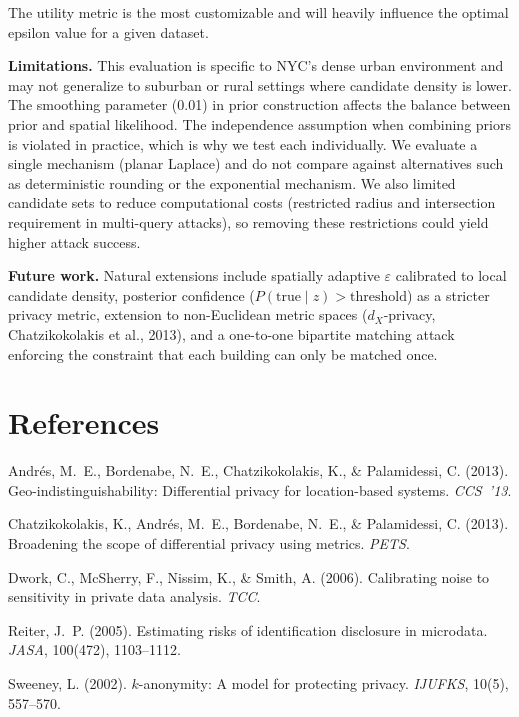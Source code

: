 \documentclass[11pt]{article}
\begin{document}
The utility metric is the most customizable and will heavily influence the optimal epsilon value for a given dataset.

\textbf{Limitations.} This evaluation is specific to NYC's dense urban environment and may not generalize to suburban or rural settings where candidate density is lower. The smoothing parameter (0.01) in prior construction affects the balance between prior and spatial likelihood. The independence assumption when combining priors is violated in practice, which is why we test each individually. We evaluate a single mechanism (planar Laplace) and do not compare against alternatives such as deterministic rounding or the exponential mechanism. We also limited candidate sets to reduce computational costs (restricted radius and intersection requirement in multi-query attacks), so removing these restrictions could yield higher attack success.

\textbf{Future work.} Natural extensions include spatially adaptive $\varepsilon$ calibrated to local candidate density, posterior confidence ($P(\text{true} \mid z) > \text{threshold}$) as a stricter privacy metric, extension to non-Euclidean metric spaces ($d_X$-privacy, Chatzikokolakis et al., 2013), and a one-to-one bipartite matching attack enforcing the constraint that each building can only be matched once.

\section{References}

\noindent Andr\'es, M.~E., Bordenabe, N.~E., Chatzikokolakis, K., \& Palamidessi, C. (2013). Geo-indistinguishability: Differential privacy for location-based systems. \textit{CCS~'13}.

\noindent Chatzikokolakis, K., Andr\'es, M.~E., Bordenabe, N.~E., \& Palamidessi, C. (2013). Broadening the scope of differential privacy using metrics. \textit{PETS}.

\noindent Dwork, C., McSherry, F., Nissim, K., \& Smith, A. (2006). Calibrating noise to sensitivity in private data analysis. \textit{TCC}.

\noindent Reiter, J.~P. (2005). Estimating risks of identification disclosure in microdata. \textit{JASA}, 100(472), 1103--1112.

\noindent Sweeney, L. (2002). $k$-anonymity: A model for protecting privacy. \textit{IJUFKS}, 10(5), 557--570.
\end{document}
